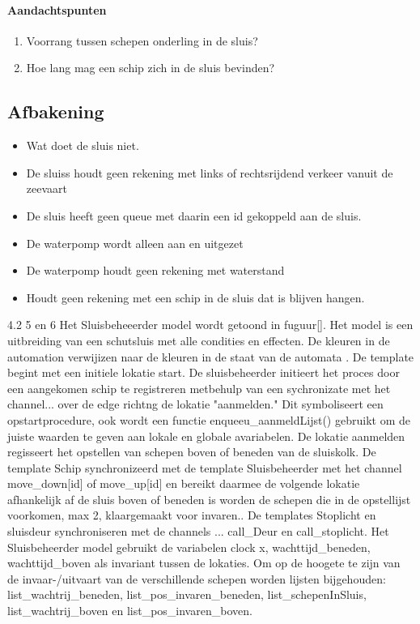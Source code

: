\paragraph{Aandachtspunten}
\begin{enumerate}
\item Voorrang tussen schepen onderling in de sluis?
\item Hoe lang mag een schip zich in de sluis bevinden?
\end{enumerate} 




\subsection{Afbakening}
\begin{itemize}
\item Wat doet de sluis niet.
\item De sluiss houdt geen rekening met links of rechtsrijdend verkeer vanuit de zeevaart
\item De sluis heeft geen queue met daarin een id gekoppeld aan de sluis.
\item De waterpomp wordt alleen aan en uitgezet
\item De waterpomp houdt geen rekening met waterstand
\item Houdt geen rekening met een schip in de sluis dat is blijven hangen.

\end{itemize}






4.2 5 en 6
Het Sluisbeheeerder model wordt getoond in fuguur[]. Het model is een uitbreiding van een schutsluis met alle condities en effecten. De kleuren in de automation verwijizen naar de kleuren in de staat van de automata . De template begint met een initiele lokatie start. De sluisbeheerder initieert het proces door een aangekomen schip te registreren metbehulp van een sychronizate met het channel... over de edge richtng de lokatie "aanmelden." Dit symboliseert een opstartprocedure, ook wordt een functie enqueeu_aanmeldLijst() gebruikt om de juiste waarden te geven aan lokale en globale avariabelen. De lokatie aanmelden regisseert het opstellen van schepen boven of beneden van de sluiskolk. De template Schip synchronizeerd met de template Sluisbeheerder met het channel move_down[id] of move_up[id] en bereikt daarmee de volgende lokatie afhankelijk af de sluis boven of beneden is worden de schepen die in de opstellijst voorkomen, max 2, klaargemaakt voor invaren.. De templates Stoplicht en sluisdeur synchroniseren met de channels ... call_Deur en call_stoplicht.
Het Sluisbeheerder model gebruikt de variabelen clock x, wachttijd_beneden, wachttijd_boven als invariant tussen de lokaties. Om op de hoogete te zijn van de invaar-/uitvaart van de verschillende schepen worden lijsten bijgehouden: list_wachtrij_beneden, list_pos_invaren_beneden, list_schepenInSluis, list_wachtrij_boven en list_pos_invaren_boven.

